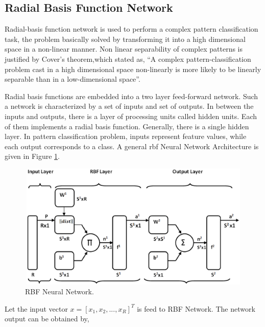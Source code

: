 
\newpage
\subsection{Radial Basis Function Network}
\label{section_radial_basis_function}

Radial-basis function network is used to perform a complex pattern classification task, the problem basically solved by transforming it into a high dimensional space in a non-linear manner. Non linear separability of complex patterns is justified by Cover's theorem,which stated as, ``A complex pattern-classification problem cast in a high dimensional space non-linearly is more likely to be linearly separable than in a low-dimensional space''.

Radial basis functions are embedded into a two layer feed-forward network. Such a  network is characterized by a set of inputs and set of outputs. In between the inputs and outputs, there is a layer of processing units called hidden units. Each of them implements a radial basis function. Generally, there is a single hidden layer. In pattern classification problem, inputs represent feature values, while each output corresponds to a class. A general \ac{rbf} Neural Network Architecture is given in Figure \ref{figure_rbf}.

\begin{figure}[h]
\centering
\includegraphics[width=350pt,height=170pt]{figures/ann/RBF.eps}
\caption{RBF Neural Network.}
\label{figure_rbf}
\end{figure}
Let the input vector $x=[x_1,x_2,...,x_R]^T$ is feed to RBF Network. The network output can be obtained by,

